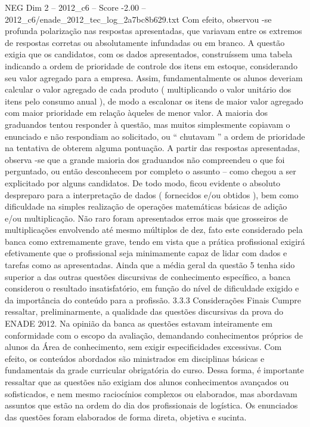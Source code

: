 \begin{textsample}{NEG Dim 2 – 2012\_c6 – Score -2.00 – 2012\_c6/enade\_2012\_tec\_log\_2a7bc8b629.txt}
Com efeito, observou -se profunda polarização nas respostas apresentadas, que variavam entre os extremos de respostas corretas ou absolutamente infundadas ou em branco.
A questão exigia que os candidatos, com os dados apresentados, construíssem uma tabela indicando a ordem de prioridade de controle dos itens em estoque, considerando seu valor agregado para a empresa.
Assim, fundamentalmente os alunos deveriam calcular o valor agregado de cada produto ( multiplicando o valor unitário dos itens pelo consumo anual ), de modo a escalonar os itens de maior valor agregado com maior prioridade em relação àqueles de menor valor.
A maioria dos graduandos tentou responder à questão, mas muitos simplesmente copiavam o enunciado e não respondiam ao solicitado, ou “ chutavam ” a ordem de prioridade na tentativa de obterem alguma pontuação.
A partir das respostas apresentadas, observa -se que a grande maioria dos graduandos não compreendeu o que foi perguntado, ou então desconhecem por completo o assunto – como chegou a ser explicitado por alguns candidatos.
De todo modo, ficou evidente o absoluto despreparo para a interpretação de dados ( fornecidos e/ou obtidos ), bem como dificuldade na simples realização de operações matemáticas básicas de adição e/ou multiplicação.
Não raro foram apresentados erros mais que grosseiros de multiplicações envolvendo até mesmo múltiplos de dez, fato este considerado pela banca como extremamente grave, tendo em vista que a prática profissional exigirá efetivamente que o profissional seja minimamente capaz de lidar com dados e tarefas como as apresentadas.
Ainda que a média geral da questão 5 tenha sido superior a das outras questões discursivas de conhecimento específico, a banca considerou o resultado insatisfatório, em função do nível de dificuldade exigido e da importância do conteúdo para a profissão. 3.3.3 Considerações Finais Cumpre ressaltar, preliminarmente, a qualidade das questões discursivas da prova do ENADE 2012.
Na opinião da banca as questões estavam inteiramente em conformidade com o escopo da avaliação, demandando conhecimentos próprios de alunos da Área de conhecimento, sem exigir especificidades excessivas.
Com efeito, os conteúdos abordados são ministrados em disciplinas básicas e fundamentais da grade curricular obrigatória do curso.
Dessa forma, é importante ressaltar que as questões não exigiam dos alunos conhecimentos avançados ou sofisticados, e nem mesmo raciocínios complexos ou elaborados, mas abordavam assuntos que estão na ordem do dia dos profissionais de logística.
Os enunciados das questões foram elaborados de forma direta, objetiva e sucinta.

\end{textsample}

